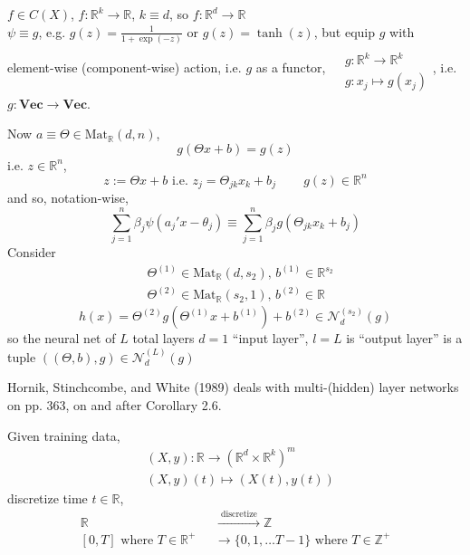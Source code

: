 \documentclass[10pt]{amsart}
\begin{document}
\begin{multicols*}{2}
$f\in C(X)$, $f:\mathbb{R}^k\to \mathbb{R}$, $k\equiv d$, so $f:\mathbb{R}^d \to \mathbb{R}$ \\
 
$\psi \equiv g$, e.g. $g(z) = \frac{1}{1 + \exp{(-z)} }$ or $g(z) = \tanh{(z)}$, but equip $g$ with element-wise (component-wise) action, i.e. $g$ as a functor, $\begin{aligned} & \quad \\ 
    & g:\mathbb{R}^k \to \mathbb{R}^k \\
    & g:x_j\mapsto g(x_j) \end{aligned}$, i.e. $g: \mathbf{Vec} \to \mathbf{Vec}$.


  Now $a \equiv \Theta \in \text{Mat}_{\mathbb{R}}(d,n)$,
  \[
g(\Theta x + b) = g(z)
\]
i.e. $z\in \mathbb{R}^n$,
\[
z:= \Theta x + b \text{ i.e. } z_j = \Theta_{jk} x_k + b_j \qquad \, g(z) \in \mathbb{R}^n
\]
and so, notation-wise,
\[
\sum_{j=1}^n \beta_j \psi(a_j'x  - \theta_j) \equiv \sum_{j=1}^n \beta_j g(\Theta_{jk} x_k +b_j)
\]
Consider
\[
\begin{aligned}
  & \Theta^{(1)} \in \text{Mat}_{\mathbb{R}}(d,s_2), \, b^{(1)} \in \mathbb{R}^{s_2} \\ 
  & \Theta^{(2)} \in \text{Mat}_{\mathbb{R}}(s_2,1) , \, b^{(2)} \in \mathbb{R}
\end{aligned}
\]
\[
h(x) = \Theta^{(2)}g( \Theta^{(1)}x + b^{(1)}) + b^{(2)} \in \mathcal{N}_d^{(s_2)}(g)
\]
so the neural net of $L$ total layers $d=1$ ``input layer'', $l=L$ is ``output layer'' is a tuple $((\Theta,b),g)\in \mathcal{N}_d^{(L)}(g)$

Hornik, Stinchcombe, and White (1989) \cite{HSW1989} deals with multi-(hidden) layer networks on pp. 363, on and after Corollary 2.6.

Given training data,
\begin{equation}
  \begin{aligned}
    & (X,y) : \mathbb{R} \to (\mathbb{R}^d \times \mathbb{R}^k)^m \\ 
    & (X,y)(t) \mapsto (X(t),y(t))
    \end{aligned}
\end{equation}
discretize time $t\in \mathbb{R}$,
\begin{equation}
  \begin{aligned}
    \mathbb{R} &  \xrightarrow{ \text{ discretize }} \mathbb{Z} \\
 [0,T]\text{ where $T \in \mathbb{R}^+$ } & \to \lbrace 0 , 1, \dots T-1 \rbrace \text{ where } T\in \mathbb{Z}^+
    \end{aligned}
  \end{equation}


\end{multicols*}
\end{document}
